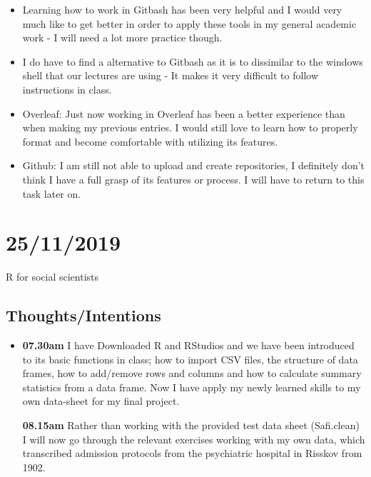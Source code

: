 \documentclass{article}
\begin{document}
\begin{itemize}
\item Learning how to work in Gitbash has been very helpful and I would very much like to get better in order to apply these tools in my general academic work - I will need a lot more practice though. 
\item I do have to find a alternative to Gitbash as it is to dissimilar to the windows shell that our lectures are using - It makes it very difficult to follow instructions in class. 
\item Overleaf: Just now working in Overleaf has been a better experience than when making my previous entries. I would still love to learn how to properly format and become comfortable with utilizing its features. 
\item Github: I am  still not able to upload and create repositories, I definitely don’t think I have a full grasp of its features or process. I will have to return to this task later on. 
\end{itemize}

\section{25/11/2019}

R for social scientists


\subsection{Thoughts/Intentions}

\begin{itemize}
\item \textbf {07.30am} I have Downloaded R and RStudios and we have been introduced to its basic functions in class; how to import CSV files, the structure of data frames, how to add/remove rows and columns and how to calculate summary statistics from a data frame. Now I have apply my newly learned skills to my own data-sheet for my final project.
 
\textbf{08.15am} Rather than working with the provided test data sheet (Safi.clean) I will now go through the relevant exercises working with my own data, which transcribed admission protocols from the psychiatric hospital in Risskov from 1902. 
\end{itemize}
\end{document}
